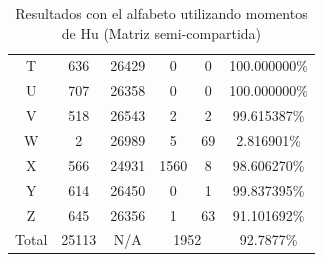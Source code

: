 \documentclass[a4paper, 11pt, oneside]{report}
\begin{document}
\begin{table}
\begin{tabular}{|c|c|c|c|c|c|}
T & 636 & 26429 & 0 & 0 & 100.000000\% \\ 
U & 707 & 26358 & 0 & 0 & 100.000000\% \\ 
V & 518 & 26543 & 2 & 2 & 99.615387\% \\ 
W & 2 & 26989 & 5 & 69 & 2.816901\% \\ 
X & 566 & 24931 & 1560 & 8 & 98.606270\% \\ 
Y & 614 & 26450 & 0 & 1 & 99.837395\% \\ 
Z & 645 & 26356 & 1 & 63 & 91.101692\% \\ 
\hline
Total & 25113 & N/A & \multicolumn{2}{|c|}{1952} & 92.7877\% \\
\hline
\end{tabular}
\caption{Resultados con el alfabeto utilizando momentos de Hu (Matriz semi-compartida)}
\label{tb:alphaHuShared}
\end{table}
\end{document}
